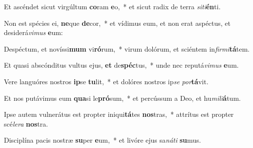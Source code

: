 \item Et ascéndet sicut virgúltum \textbf{co}ram \textbf{e}o,~* et sicut radix de terra \textit{si}\textit{ti}\textbf{én}ti.
\item Non est spécies ei, \textbf{ne}que \textbf{de}cor,~* et vídimus eum, et non erat aspéctus, et desiderá\textit{vi}\textit{mus} \textbf{e}um:
\item Despéctum, et novíssi\textbf{mum} vi\textbf{ró}rum,~* virum dolórum, et sciéntem in\textit{fir}\textit{mi}\textbf{tá}tem.
\item Et quasi abscónditus vultus ejus, \textbf{et} de\textbf{spéc}tus,~* unde nec reputá\textit{vi}\textit{mus} \textbf{e}um.
\item Vere languóres nostros \textbf{ip}se \textbf{tu}lit,~* et dolóres nostros ip\textit{se} \textit{por}\textbf{tá}vit.
\item Et nos putávimus eum \textbf{qua}si le\textbf{pró}sum,~* et percússum a Deo, et hu\textit{mi}\textit{li}\textbf{á}tum.
\item Ipse autem vulnerátus est propter iniqui\textbf{tá}tes \textbf{nos}tras,~* attrítus est propter scé\textit{le}\textit{ra} \textbf{nos}tra.
\item Disciplína pacis nostræ \textbf{su}per \textbf{e}um,~* et livóre ejus sa\textit{ná}\textit{ti} \textbf{su}mus.
